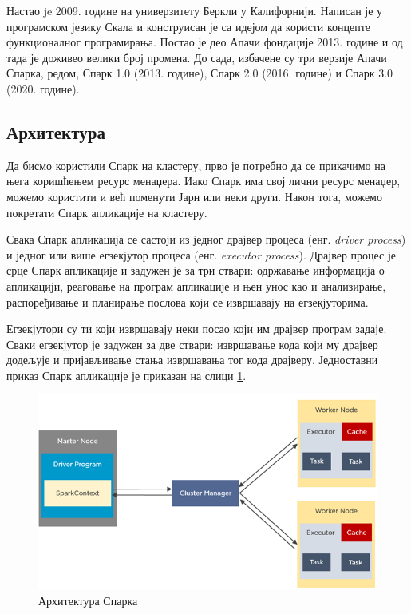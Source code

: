 \documentclass[12pt,oneside]{memoir}
\begin{document}
Настао je 2009. године на универзитету Беркли у Калифорнији. Написан је у програмском језику Скала и конструисан је са идејом да користи концепте функционалног програмирања. Постао је део Апачи фондације 2013. године и од тада је доживео велики број промена. До сада, избачене су три верзије Апачи Спарка, редом, Спарк 1.0 (2013. године), Спарк 2.0 (2016. године) и Спарк 3.0 (2020. године).

\subsection{Архитектура}
\label{subsec:spark_arx}

Да бисмо користили Спарк на кластеру, прво је потребно да се прикачимо на њега коришћењем ресурс менаџера. Иако Спарк има свој лични ресурс менаџер, можемо користити и већ поменути Јарн или неки други. Након тога, можемо покретати Спарк апликације на кластеру.

Свака Спарк апликација се састоји из једног драјвер процеса (енг. \textit{driver process}) и једног или више егзекјутор процеса (енг. \textit{executor process}). Драјвер процес је срце Спарк апликације и задужен је за три ствари: одржавање информација о апликацији, реаговање на програм апликације и њен унос као и анализирање, распоређивање и планирање послова који се извршавају на егзекјуторима. 

Егзекјутори су ти који извршавају неки посао који им драјвер програм задаје. Сваки егзекјутор је задужен за две ствари: извршавање кода који му драјвер додељује и пријављивање стања извршавања тог кода драјверу. Једноставни приказ Спарк апликације је приказан на слици \ref{fig:spark_arhtt}. \cite{spark_guide}

\begin{figure}[!ht]
  \centering
  \includegraphics[width=1\textwidth]{pictures/spark_architecture.png}
  \caption{Архитектура Спарка}
  \label{fig:spark_arhtt}
\end{figure}
\end{document}
